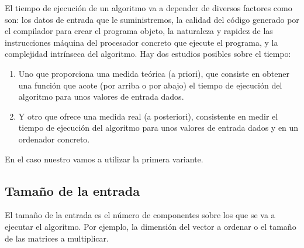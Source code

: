 El tiempo de ejecución de un algoritmo va a depender de diversos factores
como son: los datos de entrada que le suministremos, la calidad del código
generado por el compilador para crear el programa objeto, la naturaleza y rapidez
de las instrucciones máquina del procesador concreto que ejecute el programa, y la
 complejidad intrínseca del algoritmo. Hay dos estudios posibles sobre el tiempo:

\begin{enumerate}
	\item Uno que proporciona una medida teórica (a priori), que consiste en obtener una
función que acote (por arriba o por abajo) el tiempo de ejecución del algoritmo
para unos valores de entrada dados.
	\item Y otro que ofrece una medida real (a posteriori), consistente en medir el tiempo
de ejecución del algoritmo para unos valores de entrada dados y en un
ordenador concreto.
\end{enumerate}

En el caso nuestro vamos a utilizar la primera variante.

\subsection{Tamaño de la entrada}
El tamaño de la entrada es el número de componentes sobre los que
se va a ejecutar el algoritmo. Por ejemplo, la dimensión del vector a ordenar o el
tamaño de las matrices a multiplicar.